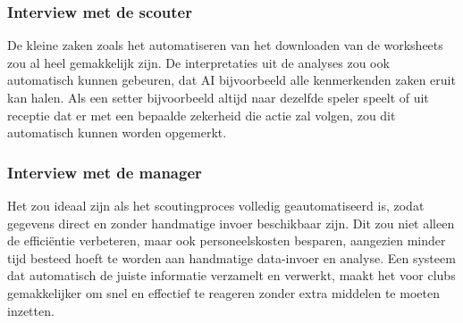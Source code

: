 \begin{enumerate}
  \subsubsection{Interview met de scouter}
  De kleine zaken zoals het automatiseren van het downloaden van de worksheets zou al heel gemakkelijk zijn. De interpretaties uit de analyses zou ook automatisch kunnen gebeuren, dat AI bijvoorbeeld alle kenmerkenden zaken eruit kan halen. Als een setter bijvoorbeeld altijd naar dezelfde speler speelt of uit receptie dat er met een bepaalde zekerheid die actie zal volgen, zou dit automatisch kunnen worden opgemerkt. 
  \subsubsection{Interview met de manager}
  Het zou ideaal zijn als het scoutingproces volledig geautomatiseerd is, zodat gegevens direct en zonder handmatige invoer beschikbaar zijn. Dit zou niet alleen de efficiëntie verbeteren, maar ook personeelskosten besparen, aangezien minder tijd besteed hoeft te worden aan handmatige data-invoer en analyse. Een systeem dat automatisch de juiste informatie verzamelt en verwerkt, maakt het voor clubs gemakkelijker om snel en effectief te reageren zonder extra middelen te moeten inzetten.
\end{enumerate}


